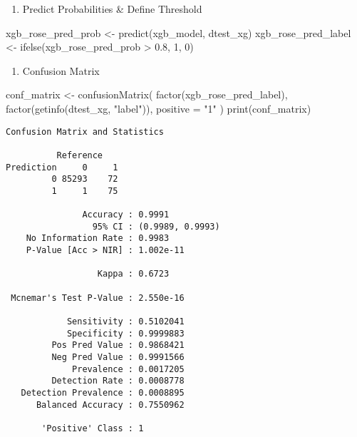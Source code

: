 \documentclass[
  11pt,
  letterpaper,
  DIV=11,
  numbers=noendperiod]{scrartcl}
\newenvironment{Shaded}{}{}
\newcommand{\AttributeTok}[1]{\textcolor[rgb]{0.84,0.23,0.29}{#1}}
\newcommand{\DecValTok}[1]{\textcolor[rgb]{0.00,0.36,0.77}{#1}}
\newcommand{\FloatTok}[1]{\textcolor[rgb]{0.00,0.36,0.77}{#1}}
\newcommand{\FunctionTok}[1]{\textcolor[rgb]{0.44,0.26,0.76}{#1}}
\newcommand{\NormalTok}[1]{\textcolor[rgb]{0.14,0.16,0.18}{#1}}
\newcommand{\OtherTok}[1]{\textcolor[rgb]{0.44,0.26,0.76}{#1}}
\newcommand{\SpecialCharTok}[1]{\textcolor[rgb]{0.00,0.36,0.77}{#1}}
\newcommand{\StringTok}[1]{\textcolor[rgb]{0.01,0.18,0.38}{#1}}
\providecommand{\tightlist}{%
  \setlength{\itemsep}{0pt}\setlength{\parskip}{0pt}}\usepackage{longtable,booktabs,array}
\begin{document}
\begin{enumerate}
\def\labelenumi{\arabic{enumi}.}
\setcounter{enumi}{5}
\tightlist
\item
  Predict Probabilities \& Define Threshold
\end{enumerate}

\begin{Shaded}
\begin{Highlighting}[]
\NormalTok{xgb\_rose\_pred\_prob }\OtherTok{\textless{}{-}} \FunctionTok{predict}\NormalTok{(xgb\_model, dtest\_xg)}
\NormalTok{xgb\_rose\_pred\_label }\OtherTok{\textless{}{-}} \FunctionTok{ifelse}\NormalTok{(xgb\_rose\_pred\_prob }\SpecialCharTok{\textgreater{}} \FloatTok{0.8}\NormalTok{, }\DecValTok{1}\NormalTok{, }\DecValTok{0}\NormalTok{)}
\end{Highlighting}
\end{Shaded}

\begin{enumerate}
\def\labelenumi{\arabic{enumi}.}
\setcounter{enumi}{6}
\tightlist
\item
  Confusion Matrix
\end{enumerate}

\begin{Shaded}
\begin{Highlighting}[]
\NormalTok{conf\_matrix }\OtherTok{\textless{}{-}} \FunctionTok{confusionMatrix}\NormalTok{(}
  \FunctionTok{factor}\NormalTok{(xgb\_rose\_pred\_label),}
  \FunctionTok{factor}\NormalTok{(}\FunctionTok{getinfo}\NormalTok{(dtest\_xg, }\StringTok{"label"}\NormalTok{)),}
  \AttributeTok{positive =} \StringTok{"1"}
\NormalTok{)}
\FunctionTok{print}\NormalTok{(conf\_matrix)}
\end{Highlighting}
\end{Shaded}

\begin{verbatim}
Confusion Matrix and Statistics

          Reference
Prediction     0     1
         0 85293    72
         1     1    75
                                          
               Accuracy : 0.9991          
                 95% CI : (0.9989, 0.9993)
    No Information Rate : 0.9983          
    P-Value [Acc > NIR] : 1.002e-11       
                                          
                  Kappa : 0.6723          
                                          
 Mcnemar's Test P-Value : 2.550e-16       
                                          
            Sensitivity : 0.5102041       
            Specificity : 0.9999883       
         Pos Pred Value : 0.9868421       
         Neg Pred Value : 0.9991566       
             Prevalence : 0.0017205       
         Detection Rate : 0.0008778       
   Detection Prevalence : 0.0008895       
      Balanced Accuracy : 0.7550962       
                                          
       'Positive' Class : 1               
                                          
\end{verbatim}
\end{document}
